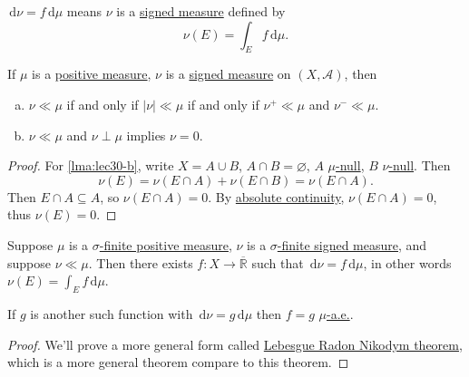 \begin{notation}
	\(\,\mathrm{d} \nu = f \,\mathrm{d} \mu\) means \(\nu\) is a \hyperref[def:signed-measure]{signed measure} defined by
	\[
		\nu(E) = \int_E f \,\mathrm{d} \mu.
	\]
\end{notation}

\begin{lemma}\label{lma:lec30}
	If \(\mu\) is a \hyperref[def:signed-measure]{positive measure}, \(\nu\) is a \hyperref[def:signed-measure]{signed measure} on \((X, \mathcal{A})\), then
	\begin{enumerate}[(a)]
		\item\label{lma:lec30-a} \(\nu \ll \mu\) if and only if \(\left\vert \nu \right\vert \ll \mu\) if and only if \(\nu^+ \ll \mu\) and \(\nu^- \ll \mu\).
		\item\label{lma:lec30-b} \(\nu \ll \mu\) and \(\nu \perp \mu\) implies \(\nu = 0\).
	\end{enumerate}
\end{lemma}

\begin{proof}
	For \autoref{lma:lec30-b}, write \(X = A \cup B\), \(A \cap B = \varnothing\), \(A\) \hyperref[def:null-set-for-a-signed-measure]{\(\mu\)-null}, \(B\) \hyperref[def:null-set-for-a-signed-measure]{\(\nu\)-null}. Then
	\[
		\nu(E) = \nu(E \cap A) + \nu(E \cap B) = \nu(E \cap A).
	\]
	Then \(E \cap A \subseteq A\), so \(\nu(E \cap A) = 0\). By \hyperref[def:absolutely-continuous-measure]{absolute continuity}, \(\nu(E \cap A) = 0\), thus \(\nu(E) = 0\).
\end{proof}

\begin{theorem}\label{thm:Radon-Nikodym}
	Suppose \(\mu\) is a \hyperref[def:finite-signed-measure]{\(\sigma\)-finite positive measure}, \(\nu\) is a \hyperref[def:finite-signed-measure]{\(\sigma\)-finite signed measure}, and suppose \(\nu \ll \mu\). Then there exists \(f \colon X \to \overline{\mathbb{R}}\) such that \(\,\mathrm{d} \nu = f \,\mathrm{d} \mu\), in other words \(\nu(E) = \int_E f \,\mathrm{d} \mu\).

	If \(g\) is another such function with \(\,\mathrm{d} \nu = g \,\mathrm{d} \mu\) then \(f = g\) \hyperref[def:mu-almost-everywhere]{\(\mu\)-a.e.}.
\end{theorem}
\begin{proof}
	We'll prove a more general form called \hyperref[thm:Lebesgue-Radon-Nikodym]{Lebesgue Radon Nikodym theorem}, which is a more general theorem compare to this theorem.
\end{proof}

